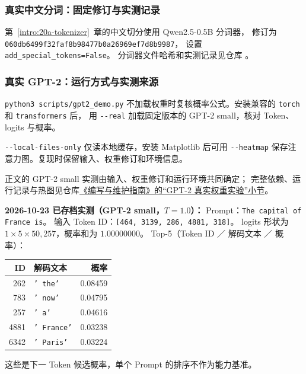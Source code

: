 \subsubsection*{真实中文分词：固定修订与实测记录}
\label{app:tokenizer-record}

第~\ref*{intro:20a-tokenizer}~章的中文切分使用 Qwen2.5-0.5B 分词器，
修订为 \nolinkurl{060db6499f32faf8b98477b0a26969ef7d8b9987}，
设置 \texttt{add\_special\_tokens=False}。
分词器文件哈希和实测记录见仓库 。

\subsubsection*{真实 GPT-2：运行方式与实测来源}

\texttt{python3 scripts/gpt2\_demo.py}
不加载权重时复核概率公式。安装兼容的 \texttt{torch} 和 \texttt{transformers} 后，
用 \texttt{-{}-real} 加载固定版本的 GPT-2 small，核对 Token、logits 与概率。

\texttt{-{}-local-files-only} 仅读本地缓存，安装 Matplotlib 后可用
\texttt{-{}-heatmap} 保存注意力图。复现时保留输入、权重修订和环境信息。

正文的 GPT-2 small 实测由输入、权重修订和运行环境共同确定；
完整依赖、运行记录与热图见仓库\href{https://github.com/CoCoThink/ai-by-intuition/blob/main/CONTRIBUTING.md\#gpt-2-\%E7\%9C\%9F\%E5\%AE\%9E\%E6\%9D\%83\%E9\%87\%8D\%E5\%AE\%9E\%E9\%AA\%8C}{《编写与维护指南》的“GPT-2 真实权重实验”小节}。

\textbf{2026-10-23 已存档实测（GPT-2 small，$T=1.0$）：}
Prompt：\texttt{The capital of France is}。
输入 Token ID：\texttt{[464, 3139, 286, 4881, 318]}。
logits 形状为 $1\times5\times50{,}257$，概率和为 $1.00000000$。
Top-5（Token ID ／ 解码文本 ／ 概率）：

\begin{center}\small
{}
\begin{tabularx}{\linewidth}{@{}r>{\raggedright\arraybackslash}Xr@{}}
\toprule
ID & 解码文本 & 概率\\\midrule
262 & \texttt{' the'} & 0.08459\\
783 & \texttt{' now'} & 0.04795\\
257 & \texttt{' a'} & 0.04616\\
4881 & \texttt{' France'} & 0.03238\\
6342 & \texttt{' Paris'} & 0.03224\\
\bottomrule
\end{tabularx}
\end{center}
这些是下一 Token 候选概率，单个 Prompt 的排序不作为能力基准。
